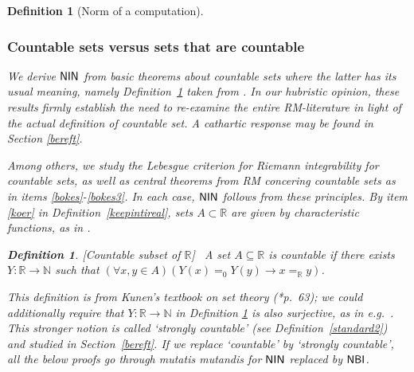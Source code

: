 \documentclass[reqno]{amsart}
\newtheorem{defi}[thm]{Definition}
\def\bdefi{\begin{defi}\rm}
\def\edefi{\end{defi}}
\def\N{{\mathbb  N}}
\def\R{{\mathbb  R}}
\def\di{\rightarrow}
\def\NBI{\textup{\textsf{NBI}}}
\def\NIN{\textup{\textsf{NIN}}}
\numberwithin{equation}{section}
\numberwithin{thm}{section}
\begin{document}
\begin{defi}[Norm of a computation]
\subsubsection{Countable sets versus sets that are countable}\label{uncountsyn}
We derive $\NIN$ from basic theorems about \emph{countable sets} where the latter has its \emph{usual} meaning, namely Definition~\ref{standard} taken from \cite{kunen}.
In our \emph{hubristic} opinion, these results firmly establish the need to re-examine the entire RM-literature in light of the actual definition of countable set. 
A \emph{cathartic} response may be found in Section \ref{bereft}.

\smallskip

Among others, we study the \emph{Lebesgue criterion for Riemann integrability} for countable sets, as well as central theorems from RM concering countable sets as in items \eqref{bokes}-\eqref{bokes3}.  
In each case, $\NIN$ follows from these principles.
By item \eqref{koer} in Definition~\ref{keepintireal}, sets $A\subset \R$ are given by characteristic functions, as in \cites{kruisje, dagsamVI, dagsamVII}.     
\bdefi[Countable subset of $\R$]\label{standard}~
A set $A\subseteq \R$ is \emph{countable} if there exists $Y:\R\di \N$ such that $(\forall x, y\in A)(Y(x)=_{0}Y(y)\di x=_{\R}y)$. 
\edefi
This definition is from Kunen's textbook on set theory (\cite{kunen}*{p.\ 63}); we \emph{could} additionally require that $Y:\R\di \N$ in Definition \ref{standard} is also \emph{surjective}, as in e.g.\ \cite{hrbacekjech}.  
This stronger notion is called `strongly countable' (see Definition~\ref{standard2}) and studied in Section~\ref{bereft}.  
If we replace `countable' by `strongly countable', all the below proofs go through \emph{mutatis mutandis} for $\NIN$ replaced by $\NBI$.  %

\smallskip


\end{defi}
\end{document}
